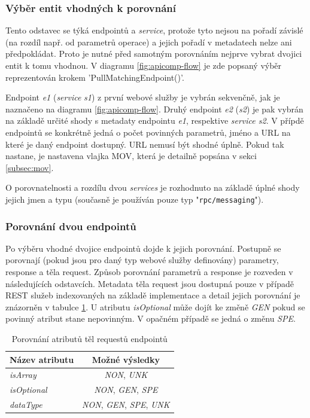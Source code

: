 \documentclass[czech,DP]{thesiskiv}
\begin{document}
\subsubsection{Výběr entit vhodných k porovnání}
\label{sec:pick-matching-entities}

Tento odstavec se týká endpointů a \textit{service}, protože tyto nejsou na pořadí závislé (na rozdíl např. od parametrů operace) a jejich pořadí v metadatech nelze ani předpokládat. Proto je nutné před samotným porovnáním nejprve vybrat dvojici entit k tomu vhodnou. V diagramu \ref{fig:apicomp-flow} je zde popsaný výběr reprezentován krokem 'PullMatchingEndpoint()'. 

Endpoint \textit{e1} (\textit{service} \textit{s1})  z první webové služby je vybrán sekvenčně, jak je naznačeno na diagramu \ref{fig:apicomp-flow}. Druhý endpoint \textit{e2} (\textit{s2}) je pak vybrán na základě určité shody s metadaty endpointu \textit{e1}, respektive \textit{service s2}. V přípdě endpointů se konkrétně jedná o počet povinných parametrů, jméno a URL na které je daný endpoint dostupný. URL nemusí být shodné úplně. Pokud tak nastane, je nastavena vlajka MOV, která je detailně popsána v sekci \ref{subsec:mov}.

O porovnatelnosti a rozdílu dvou \textit{services} je rozhodnuto na základě úplné shody jejich jmen a typu (současně je používán pouze typ "\verb|rpc/messaging|").

\subsubsection{Porovnání dvou endpointů}
Po výběru vhodné dvojice endpointů dojde k jejich porovnání. Postupně se porovnají (pokud jsou pro daný typ webové služby definovány) parametry, response a těla request. Způsob porovnání parametrů a response je rozveden v následujících odstavcích. Metadata těla request jsou dostupná pouze v případě REST služeb indexovaných na základě implementace a detail jejich porovnání je znázorněn v tabulce \ref{tab:req-body-cmp}. U atributu \textit{isOptional} může dojít ke změně \textit{GEN} pokud se povinný atribut stane nepovinným. V opačném případě se jedná o změnu \textit{SPE}.

\begin{table}[h]
	\centering
	\begin{tabular}{|l|c|}
		\hline
		Název atributu  & Možné výsledky \\
		\hline
		\hline
		\textit{isArray} & \textit{NON}, \textit{UNK} \\
		\hline
		\textit{isOptional} & \textit{NON}, \textit{GEN}, \textit{SPE} \\
		\hline
		\textit{dataType} & \textit{NON}, \textit{GEN}, \textit{SPE}, \textit{UNK} \\
		\hline
	\end{tabular}
	\caption{Porovnání atributů těl requestů endpointů}
	\label{tab:req-body-cmp}
\end{table}
\end{document}
